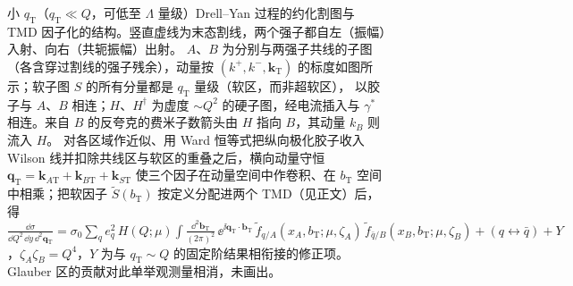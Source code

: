 \begin{figure}[htbp]
\caption{小 $q_{\mathrm T}$（$q_{\mathrm T}\ll Q$，可低至 $\Lambda$ 量级）Drell--Yan 过程的约化割图与 TMD 因子化的结构。竖直虚线为末态割线，两个强子都自左（振幅）入射、向右（共轭振幅）出射。
$A$、$B$ 为分别与两强子共线的子图（各含穿过割线的强子残余），动量按 $(k^+,k^-,\boldsymbol k_{\mathrm T})$ 的标度如图所示；软子图 $S$ 的所有分量都是 $q_{\mathrm T}$ 量级（软区，而非超软区），
以胶子与 $A$、$B$ 相连；$H$、$H^\dagger$ 为虚度 $\sim Q^2$ 的硬子图，经电流插入与 $\gamma^*$ 相连。来自 $B$ 的反夸克的费米子数箭头由 $H$ 指向 $B$，其动量 $k_B$ 则流入 $H$。
对各区域作近似、用 Ward 恒等式把纵向极化胶子收入 Wilson 线并扣除共线区与软区的重叠之后，横向动量守恒 $\boldsymbol q_{\mathrm T}=\boldsymbol k_{A\mathrm T}+\boldsymbol k_{B\mathrm T}+\boldsymbol k_{S\mathrm T}$ 使三个因子在动量空间中作卷积、在 $b_{\mathrm T}$ 空间中相乘；把软因子 $\tilde S(b_{\mathrm T})$ 按定义分配进两个 TMD（见正文）后，得
$\frac{\dd\sigma}{\dd Q^2\,\dd y\,\dd^2\boldsymbol q_{\mathrm T}}=\sigma_0\sum_q e_q^2\,H(Q;\mu)\int\frac{\dd^2\boldsymbol b_{\mathrm T}}{(2\pi)^2}\,\ee^{\ii\boldsymbol q_{\mathrm T}\cdot\boldsymbol b_{\mathrm T}}\,
\tilde f_{q/A}(x_A,b_{\mathrm T};\mu,\zeta_A)\,\tilde f_{\bar q/B}(x_B,b_{\mathrm T};\mu,\zeta_B)+(q\leftrightarrow\bar q)+Y$，$\zeta_A\zeta_B=Q^4$，$Y$ 为与 $q_{\mathrm T}\sim Q$ 的固定阶结果相衔接的修正项。
Glauber 区的贡献对此单举观测量相消，未画出。}
\label{fig:tmd-dy}
\end{figure}

